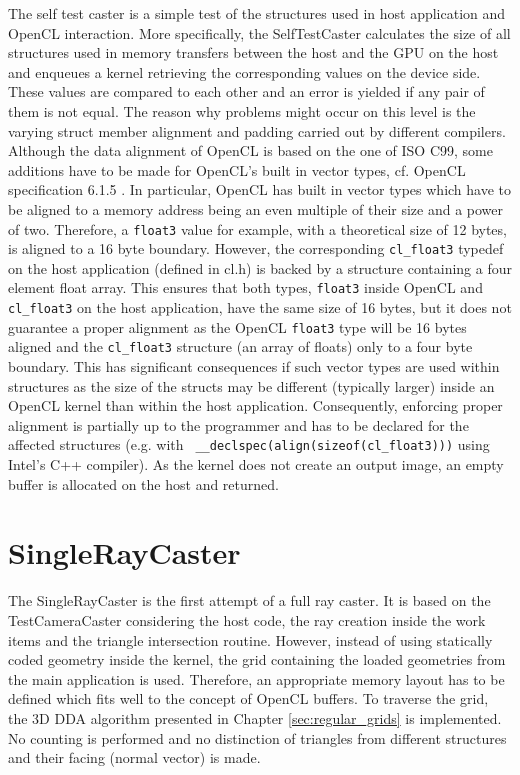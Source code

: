 The self test caster is a simple test of the structures used in host application and OpenCL interaction. More specifically, the SelfTestCaster calculates the size of all structures used in memory transfers between the host and the GPU on the host and enqueues a kernel retrieving the corresponding values on the device side. These values are compared to each other and an error is yielded if any pair of them is not equal.
The reason why problems might occur on this level is the varying struct member alignment and padding carried out by different compilers. Although the data alignment of OpenCL is based on the one of ISO C99, some additions have to be made for OpenCL's built in vector types, cf. OpenCL specification 6.1.5 \cite{opencl_spec}. In particular, OpenCL has built in vector types which have to be aligned to a memory address being an even multiple of their size and a power of two. Therefore, a \lstinline!float3! value for example, with a theoretical size of 12 bytes, is aligned to a 16 byte boundary. However, the corresponding \lstinline!cl_float3! typedef on the host application (defined in cl.h) is backed by a structure containing a four element float array. This ensures that both types, \lstinline!float3! inside OpenCL and \lstinline!cl_float3! on the host application, have the same size of 16 bytes, but it does not guarantee a proper alignment as the OpenCL \lstinline!float3! type will be 16 bytes aligned and the \lstinline!cl_float3! structure (an array of floats) only to a four byte boundary. This has significant consequences if such vector types are used within structures as the size of the structs may be different (typically larger) inside an OpenCL kernel than within the host application. Consequently, enforcing proper alignment is partially up to the programmer and has to be declared for the affected structures (e.g. with \lstinline! __declspec(align(sizeof(cl_float3)))! using Intel's C++ compiler).
As the kernel does not create an output image, an empty buffer is allocated on the host and returned.


\section{SingleRayCaster}

The SingleRayCaster is the first attempt of a full ray caster. It is based on the TestCameraCaster considering the host code, the ray creation inside the work items and the triangle intersection routine. However, instead of using statically coded geometry inside the kernel, the grid containing the loaded geometries from the main application is used. Therefore, an appropriate memory layout has to be defined which fits well to the concept of OpenCL buffers. To traverse the grid, the 3D DDA algorithm presented in Chapter \ref{sec:regular_grids} is implemented. No counting is performed and no distinction of triangles from different structures and their facing (normal vector) is made.

